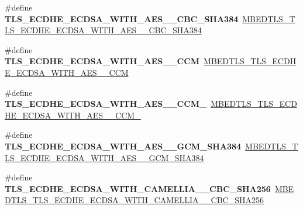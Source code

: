 \begin{DoxyCompactItemize}
\item 
\mbox{\label{compat-1_83_8h_af16b4ac6bd9cc610c408b1be8f7b4d2e}} 
\#define {\bfseries T\+L\+S\+\_\+\+E\+C\+D\+H\+E\+\_\+\+E\+C\+D\+S\+A\+\_\+\+W\+I\+T\+H\+\_\+\+A\+E\+S\+\_\+\_\+\+C\+B\+C\+\_\+\+S\+H\+A384}~\mbox{\hyperlink{ssl__ciphersuites_8h_ac7c8985571929c4a076ac7dae53ac460}{M\+B\+E\+D\+T\+L\+S\+\_\+\+T\+L\+S\+\_\+\+E\+C\+D\+H\+E\+\_\+\+E\+C\+D\+S\+A\+\_\+\+W\+I\+T\+H\+\_\+\+A\+E\+S\+\_\+\_\+\+C\+B\+C\+\_\+\+S\+H\+A384}}
\item 
\mbox{\label{compat-1_83_8h_a9d1ee1bea891d61cdad224755a2e0072}} 
\#define {\bfseries T\+L\+S\+\_\+\+E\+C\+D\+H\+E\+\_\+\+E\+C\+D\+S\+A\+\_\+\+W\+I\+T\+H\+\_\+\+A\+E\+S\+\_\+\_\+\+C\+CM}~\mbox{\hyperlink{ssl__ciphersuites_8h_adb74f5656c7d83b40eaca016af88571d}{M\+B\+E\+D\+T\+L\+S\+\_\+\+T\+L\+S\+\_\+\+E\+C\+D\+H\+E\+\_\+\+E\+C\+D\+S\+A\+\_\+\+W\+I\+T\+H\+\_\+\+A\+E\+S\+\_\+\_\+\+C\+CM}}
\item 
\mbox{\label{compat-1_83_8h_afd03144e2fea9b2ee57bd55564bc2ea7}} 
\#define {\bfseries T\+L\+S\+\_\+\+E\+C\+D\+H\+E\+\_\+\+E\+C\+D\+S\+A\+\_\+\+W\+I\+T\+H\+\_\+\+A\+E\+S\+\_\+\_\+\+C\+C\+M\+\_}~\mbox{\hyperlink{ssl__ciphersuites_8h_aada6a719705315d2d69212693aecf34b}{M\+B\+E\+D\+T\+L\+S\+\_\+\+T\+L\+S\+\_\+\+E\+C\+D\+H\+E\+\_\+\+E\+C\+D\+S\+A\+\_\+\+W\+I\+T\+H\+\_\+\+A\+E\+S\+\_\+\_\+\+C\+C\+M\+\_}}
\item 
\mbox{\label{compat-1_83_8h_af72ed33cfc1e9977b62253dae53923e2}} 
\#define {\bfseries T\+L\+S\+\_\+\+E\+C\+D\+H\+E\+\_\+\+E\+C\+D\+S\+A\+\_\+\+W\+I\+T\+H\+\_\+\+A\+E\+S\+\_\+\_\+\+G\+C\+M\+\_\+\+S\+H\+A384}~\mbox{\hyperlink{ssl__ciphersuites_8h_a623797e4c376e49eee56ea5529b11c02}{M\+B\+E\+D\+T\+L\+S\+\_\+\+T\+L\+S\+\_\+\+E\+C\+D\+H\+E\+\_\+\+E\+C\+D\+S\+A\+\_\+\+W\+I\+T\+H\+\_\+\+A\+E\+S\+\_\+\_\+\+G\+C\+M\+\_\+\+S\+H\+A384}}
\item 
\mbox{\label{compat-1_83_8h_a31ffae6edf6bd5396c78a58695f9d1b7}} 
\#define {\bfseries T\+L\+S\+\_\+\+E\+C\+D\+H\+E\+\_\+\+E\+C\+D\+S\+A\+\_\+\+W\+I\+T\+H\+\_\+\+C\+A\+M\+E\+L\+L\+I\+A\+\_\+\_\+\+C\+B\+C\+\_\+\+S\+H\+A256}~\mbox{\hyperlink{ssl__ciphersuites_8h_a894e337cba52e16fea71c59b9dfc337d}{M\+B\+E\+D\+T\+L\+S\+\_\+\+T\+L\+S\+\_\+\+E\+C\+D\+H\+E\+\_\+\+E\+C\+D\+S\+A\+\_\+\+W\+I\+T\+H\+\_\+\+C\+A\+M\+E\+L\+L\+I\+A\+\_\+\_\+\+C\+B\+C\+\_\+\+S\+H\+A256}}

\end{DoxyCompactItemize}
